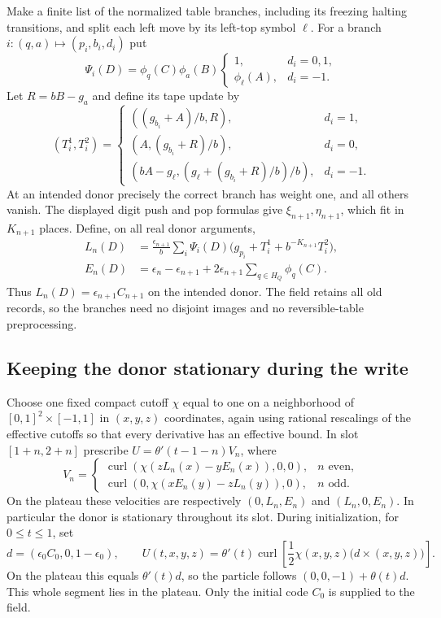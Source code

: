 Make a finite list of the normalized table branches, including its
freezing halting transitions, and split each left move by its left-top
symbol $\ell$. For a branch
$i:(q,a)\mapsto(p_i,b_i,d_i)$ put
\[
 \Psi_i(D)=\phi_q(C)\phi_a(B)
 \begin{cases}1,&d_i=0,1,\\\phi_\ell(A),&d_i=-1.\end{cases}
\]
Let $R=bB-g_a$ and define its tape update by
\begin{equation}
 (T_i^1,T_i^2)=
 \begin{cases}
 ((g_{b_i}+A)/b,R),&d_i=1,\\
 (A,(g_{b_i}+R)/b),&d_i=0,\\
 (bA-g_\ell,(g_\ell+(g_{b_i}+R)/b)/b),&d_i=-1.
 \end{cases}
 \label{eq:alternating-update}
\end{equation}
At an intended donor precisely the correct branch has weight one, and
all others vanish.  The displayed digit push and pop formulas give
$\xi_{n+1},\eta_{n+1}$, which fit in $K_{n+1}$ places.  Define, on
all real donor arguments,
\begin{align}
 L_n(D)&=\frac{\epsilon_{n+1}}b
    \sum_i\Psi_i(D)
       \bigl(g_{p_i}+T_i^1+b^{-K_{n+1}}T_i^2\bigr),
       \label{eq:alternating-write}\\
 E_n(D)&=\epsilon_n-\epsilon_{n+1}
       +2\epsilon_{n+1}\sum_{q\in H_Q}\phi_q(C).
       \label{eq:alternating-signal}
\end{align}
Thus $L_n(D)=\epsilon_{n+1}C_{n+1}$ on the intended donor.
The field retains all old records, so the branches need no disjoint
images and no reversible-table preprocessing.

\subsection{Keeping the donor stationary during the write}
Choose one fixed compact cutoff $\chi$ equal to one on a neighborhood
of $[0,1]^2\times[-1,1]$ in $(x,y,z)$ coordinates, again using rational
rescalings of the effective cutoffs so that every derivative has an
effective bound. In slot
$[1+n,2+n]$ prescribe $U=\theta'(t-1-n)V_n$, where
\begin{equation}
 V_n=
 \begin{cases}
 \operatorname{curl}(\chi(zL_n(x)-yE_n(x)),0,0),&n\text{ even},\\
 \operatorname{curl}(0,\chi(xE_n(y)-zL_n(y)),0),&n\text{ odd}.
 \end{cases}
 \label{eq:alternating-curls}
\end{equation}
On the plateau these velocities are respectively $(0,L_n,E_n)$ and
$(L_n,0,E_n)$.  In particular the donor is stationary throughout its
slot. During initialization, for $0\leq t\leq1$, set
\[
 d=(\epsilon_0C_0,0,1-\epsilon_0),\qquad
 U(t,x,y,z)=\theta'(t)\operatorname{curl}
 \left[\frac12\chi(x,y,z)\bigl(d\times(x,y,z)\bigr)\right].
\]
On the plateau this equals $\theta'(t)d$, so the particle follows
$(0,0,-1)+\theta(t)d$. This whole segment lies in the plateau.
Only the initial code $C_0$ is supplied to the field.

